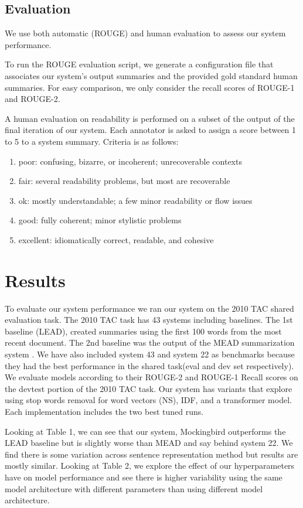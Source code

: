 \documentclass[11pt,a4paper]{article}
\begin{document}
\subsection{Evaluation}
We use both automatic (ROUGE) and human evaluation to assess our system performance. 

To run the ROUGE evaluation script, we generate a configuration file that associates our system's output summaries and the provided gold standard human summaries. For easy comparison, we only consider the recall scores of ROUGE-1 and ROUGE-2. 

A human evaluation on readability is performed on a subset of the output of the final iteration of our system. Each annotator is asked to assign a score between 1 to 5 to a system summary. Criteria is as follows:
\vspace{-0.2cm}
\begin{enumerate}
\itemsep -0.1cm
    \item  poor: confusing, bizarre, or incoherent; unrecoverable contexts
    \item fair: several readability problems, but most are recoverable
    \item ok: mostly understandable; a few minor readability or flow issues
    \item good: fully coherent; minor stylistic problems
    \item excellent: idiomatically correct, readable, and cohesive
\end{enumerate}
\section{Results}
To evaluate our system performance we ran our system on the 2010 TAC shared evaluation task. The 2010 TAC task has 43 systems including baselines. The 1st baseline (LEAD), created summaries using the first 100 words from the most recent document. The 2nd baseline was the output of the MEAD summarization system \cite{Radev2003MEADRM}. We have also included system 43 and system 22 as benchmarks because they had the best performance in the shared task(eval and dev set respectively). We evaluate models according to their ROUGE-2 and ROUGE-1 Recall scores on the devtest portion of the 2010 TAC task. Our system has variants that explore using stop words removal for word vectors (NS), IDF, and a transformer model. Each implementation includes the two best tuned runs.

Looking at Table 1, we can see that our system, Mockingbird outperforms the LEAD baseline but is slightly worse than MEAD and say behind system 22. We find there is some variation across sentence representation method but results are mostly similar. Looking at Table 2, we explore the effect of our hyperparameters have on model performance and see there is higher variability using the same model architecture with different parameters than using different model architecture.
\end{document}
